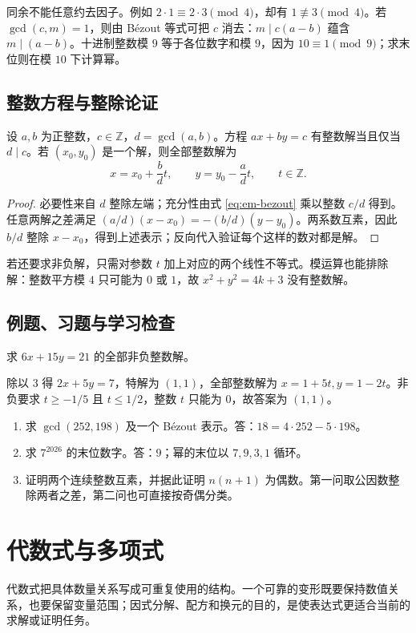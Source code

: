 \documentclass[UTF8]{ctexbook}
\begin{document}
同余不能任意约去因子。例如 $2\cdot1\equiv2\cdot3\pmod4$，却有 $1\not\equiv3\pmod4$。若 $\gcd(c,m)=1$，则由 Bézout 等式可把 $c$ 消去：$m\mid c(a-b)$ 蕴含 $m\mid(a-b)$。十进制整数模 $9$ 等于各位数字和模 $9$，因为 $10\equiv1\pmod9$；求末位则在模 $10$ 下计算幂。

\section{整数方程与整除论证}
\begin{theorem}
设 $a,b$ 为正整数，$c\in\mathbb Z$，$d=\gcd(a,b)$。方程 $ax+by=c$ 有整数解当且仅当 $d\mid c$。若 $(x_0,y_0)$ 是一个解，则全部整数解为
\[
 x=x_0+\frac bd t,\qquad y=y_0-\frac ad t,\qquad t\in\mathbb Z.
\]
\end{theorem}
\begin{proof}
必要性来自 $d$ 整除左端；充分性由式 \eqref{eq:em-bezout} 乘以整数 $c/d$ 得到。任意两解之差满足 $(a/d)(x-x_0)=-(b/d)(y-y_0)$。两系数互素，因此 $b/d$ 整除 $x-x_0$，得到上述表示；反向代入验证每个这样的数对都是解。
\end{proof}
若还要求非负解，只需对参数 $t$ 加上对应的两个线性不等式。模运算也能排除解：整数平方模 $4$ 只可能为 $0$ 或 $1$，故 $x^2+y^2=4k+3$ 没有整数解。

\section{例题、习题与学习检查}
\begin{example}
求 $6x+15y=21$ 的全部非负整数解。
\end{example}
\begin{solve}
除以 $3$ 得 $2x+5y=7$，特解为 $(1,1)$，全部整数解为 $x=1+5t,y=1-2t$。非负要求 $t\ge-1/5$ 且 $t\le1/2$，整数 $t$ 只能为 $0$，故答案为 $(1,1)$。
\end{solve}
\begin{enumerate}
\item 求 $\gcd(252,198)$ 及一个 Bézout 表示。答：$18=4\cdot252-5\cdot198$。
\item 求 $7^{2026}$ 的末位数字。答：$9$；幂的末位以 $7,9,3,1$ 循环。
\item 证明两个连续整数互素，并据此证明 $n(n+1)$ 为偶数。第一问取公因数整除两者之差，第二问也可直接按奇偶分类。
\end{enumerate}

\chapter{代数式与多项式}
\label{chap:em-expressions}
代数式把具体数量关系写成可重复使用的结构。一个可靠的变形既要保持数值关系，也要保留变量范围；因式分解、配方和换元的目的，是使表达式更适合当前的求解或证明任务。
\end{document}

